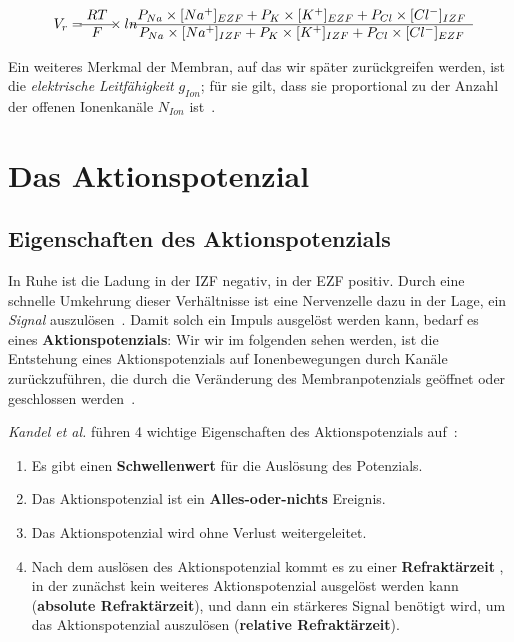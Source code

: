 {{\begin{equation}
V_{r} = \begin{matrix} RT \\ \hline F \end{matrix}  \times ln \begin{matrix}
  P_{Na} \space  \times \space [Na^+]_{EZF} \space + \space P_{K} \space  \times \space [K^+]_{EZF} \space + \space P_{Cl} \space  \times \space [Cl^-]_{IZF}  \\ \hline
  P_{Na} \space  \times [Na^+]_{IZF} \space + \space P_{K} \space  \times \space [K^+]_{IZF} \space + \space P_{Cl} \space  \times \space [Cl^-]_{EZF}
\end{matrix}
\label{eq:gl-goldman}
\end{equation}

Ein weiteres Merkmal der Membran, auf das wir später zurückgreifen werden, ist die \textit{elektrische Leitfähigkeit} $g_{Ion}$; für sie gilt, dass sie proportional zu der Anzahl der offenen Ionenkanäle $N_{Ion}$ ist~\cite[93]{BCP18}.

\section{Das Aktionspotenzial}

\subsection{Eigenschaften des Aktionspotenzials}

In Ruhe ist die Ladung in der IZF negativ, in der EZF positiv.
Durch eine schnelle Umkehrung dieser Verhältnisse ist eine Nervenzelle dazu in der Lage, ein \textit{Signal} auszulösen~\cite[86]{BCP18}.
Damit solch ein Impuls ausgelöst werden kann, bedarf es eines \textbf{Aktionspotenzials}: Wir wir im folgenden sehen werden, ist die Entstehung eines Aktionspotenzials auf Ionenbewegungen durch Kanäle zurückzuführen, die durch die Veränderung des Membranpotenzials geöffnet oder geschlossen werden~\cite[96]{BCP18}.

 \textit{Kandel et al.} führen 4 wichtige Eigenschaften des Aktionspotenzials auf~\cite[148 f.]{KSJ+13}:
\begin{enumerate}
 \item Es gibt einen \textbf{Schwellenwert} für die Auslösung des Potenzials.
 \item Das Aktionspotenzial ist ein \textbf{Alles-oder-nichts} Ereignis.
 \item Das Aktionspotenzial wird ohne Verlust weitergeleitet.
 \item Nach dem auslösen des Aktionspotenzial kommt es zu einer \textbf{Refraktärzeit} , in der zunächst kein weiteres Aktionspotenzial ausgelöst werden kann (\textbf{absolute Refraktärzeit}), und dann ein stärkeres Signal benötigt wird, um das Aktionspotenzial auszulösen (\textbf{relative Refraktärzeit}).
\end{enumerate}


}}
